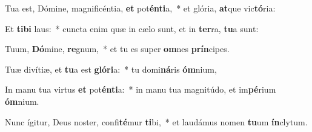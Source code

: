 \item Tua est, Dómine, magnificéntia, \textbf{et} pot\textbf{én}\textbf{ti}a,~* et glória, \textbf{at}que vic\textbf{tó}ria:
\item Et \textbf{ti}\textbf{bi} laus:~* cuncta enim quæ in cælo sunt, et in \textbf{ter}ra, \textbf{tu}a sunt:
\item Tuum, \textbf{Dó}mine, \textbf{re}gnum,~* et tu es super \textbf{om}nes \textbf{prín}cipes.
\item Tuæ divítiæ, et \textbf{tu}a est \textbf{gló}\textbf{ri}a:~* tu domi\textbf{ná}ris \textbf{óm}nium,
\item In manu tua virtus \textbf{et} pot\textbf{én}\textbf{ti}a:~* in manu tua magnitúdo, et im\textbf{pé}rium \textbf{óm}nium.
\item Nunc ígitur, Deus noster, confi\textbf{té}mur \textbf{ti}bi,~* et laudámus nomen \textbf{tu}um \textbf{ín}clytum.
